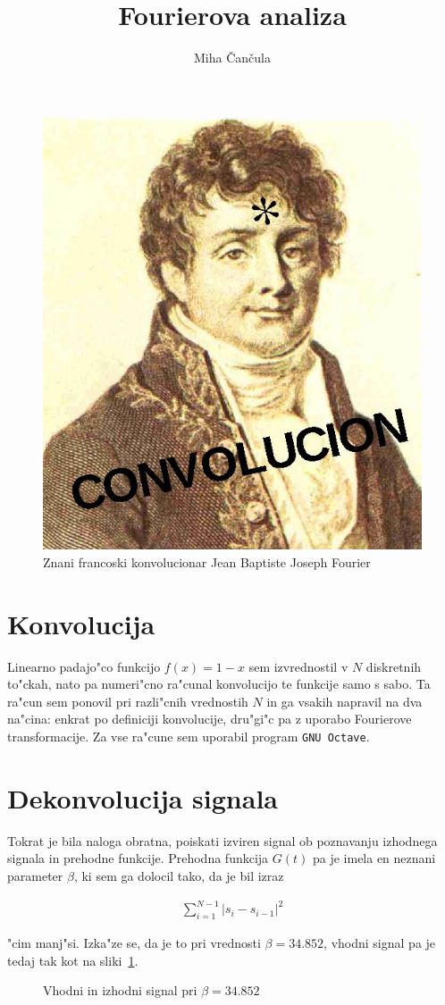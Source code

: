 \documentclass[a4paper,10pt]{article}
\title{Fourierova analiza}
\author{Miha \v Can\v cula}
\begin{document}
  \maketitle

\begin{figure}[h]
  \centering
  \includegraphics[width=.5\textwidth]{Convolucion}
  \caption{Znani francoski konvolucionar Jean Baptiste Joseph Fourier}
\end{figure}

\section{Konvolucija}

Linearno padajo"co funkcijo $f(x) = 1-x$ sem izvrednostil v $N$ diskretnih to"ckah, nato pa numeri"cno ra"cunal konvolucijo te funkcije samo s sabo. Ta ra"cun sem ponovil pri razli"cnih vrednostih $N$ in ga vsakih napravil na dva na"cina: enkrat po definiciji konvolucije, dru"gi"c pa z uporabo Fourierove transformacije. Za vse ra"cune sem uporabil program \texttt{GNU Octave}. 




\section{Dekonvolucija signala}

Tokrat je bila naloga obratna, poiskati izviren signal ob poznavanju izhodnega signala in prehodne funkcije. Prehodna funkcija $G(t)$ pa je imela en neznani parameter $\beta$, ki sem ga dolocil tako, da je bil izraz

\begin{align}
  \sum_{i=1}^{N-1} \left| s_i - s_{i-1}\right|^2
\end{align}

"cim manj"si. Izka"ze se, da je to pri vrednosti $\beta = 34.852$, vhodni signal pa je tedaj tak kot na sliki~\ref{fig:dekon-signal}. 

\begin{figure}[h]
  
\caption{Vhodni in izhodni signal pri $\beta = 34.852$}
\label{fig:dekon-signal}
\end{figure}
\end{document}
